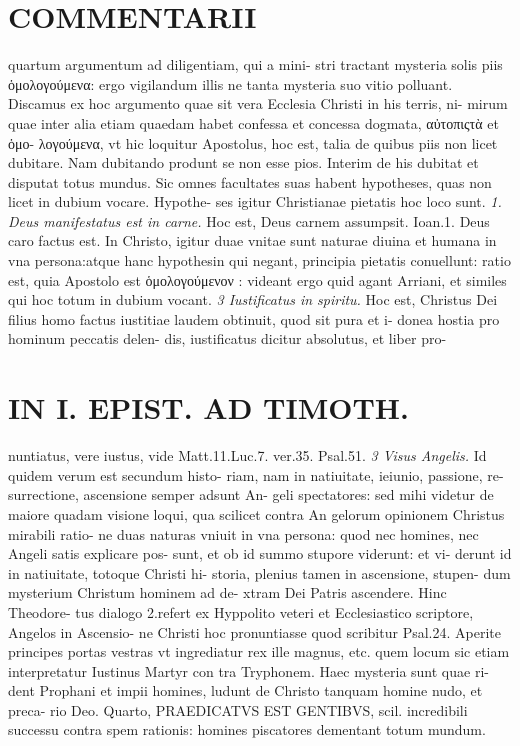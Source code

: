 \documentclass{article}
\begin{document}
\begin{pages}
\section*{COMMENTARII }
\marginpar{[ p.80 ]}\pstart quartum argumentum ad diligentiam, qui a mini- stri tractant mysteria solis piis ὁμολογούμενα: ergo vigilandum illis ne tanta mysteria suo vitio polluant. Discamus ex hoc argumento quae sit vera Ecclesia Christi in his terris, ni- mirum quae inter alia etiam quaedam habet confessa et concessa dogmata, αὐτοπιςτὰ et ὁμο- λογούμενα, vt hic loquitur Apostolus, hoc est, talia de quibus piis non licet dubitare. Nam dubitando produnt se non esse pios. Interim de his dubitat et disputat totus mundus. Sic omnes facultates suas habent hypotheses, quas non licet in dubium vocare. Hypothe- ses igitur Christianae pietatis hoc loco sunt.  \pend
\textit{1. Deus manifestatus est in carne. }\pstart Hoc est, Deus carnem assumpsit. Ioan.1. Deus caro factus est. In Christo, igitur duae vnitae sunt naturae diuina et humana in vna persona:atque hanc hypothesin qui negant, principia pietatis conuellunt: ratio est, quia Apostolo est ὁμολογούμενον : videant ergo quid agant Arriani, et similes qui hoc totum in dubium vocant.  \pend
\textit{3 Iustificatus in spiritu. }\pstart Hoc est, Christus Dei filius homo factus iustitiae laudem obtinuit, quod sit pura et i- donea hostia pro hominum peccatis delen- dis, iustificatus dicitur absolutus, et liber pro-  \pend
\section*{IN I. EPIST. AD TIMOTH. }
\marginpar{[ p.81 ]}\pstart nuntiatus, vere iustus, vide Matt.11.Luc.7. ver.35. Psal.51.  \pend
\textit{3 Visus Angelis. }\pstart Id quidem verum est secundum histo- riam, nam in natiuitate, ieiunio, passione, re- surrectione, ascensione semper adsunt An- geli spectatores: sed mihi videtur de maiore quadam visione loqui, qua scilicet contra An gelorum opinionem Christus mirabili ratio- ne duas naturas vniuit in vna persona: quod nec homines, nec Angeli satis explicare pos- sunt, et ob id summo stupore viderunt: et vi- derunt id in natiuitate, totoque Christi hi- storia, plenius tamen in ascensione, stupen- dum mysterium Christum hominem ad de- xtram Dei Patris ascendere. Hinc Theodore- tus dialogo 2.refert ex Hyppolito veteri et Ecclesiastico scriptore, Angelos in Ascensio- ne Christi hoc pronuntiasse quod scribitur Psal.24. Aperite principes portas vestras vt ingrediatur rex ille magnus, etc. quem locum sic etiam interpretatur Iustinus Martyr con tra Tryphonem. Haec mysteria sunt quae ri- dent Prophani et impii homines, ludunt de Christo tanquam homine nudo, et preca- rio Deo.  \pend\pstart Quarto, PRAEDICATVS EST GENTIBVS, scil. incredibili successu contra spem rationis: homines piscatores dementant totum mundum.  \pend

\end{pages}
\end{document}
